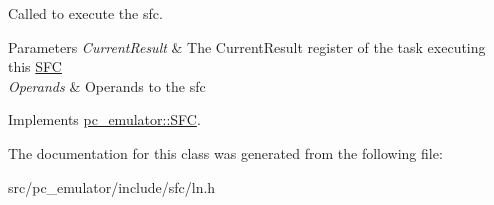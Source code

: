 Called to execute the sfc. 


\begin{DoxyParams}{Parameters}
{\em Current\+Result} & The Current\+Result register of the task executing this \hyperlink{classpc__emulator_1_1SFC}{S\+FC} \\
\hline
{\em Operands} & Operands to the sfc \\
\hline
\end{DoxyParams}


Implements \hyperlink{classpc__emulator_1_1SFC_ab206c80fc0e429c56672b4f6a0ca8635}{pc\+\_\+emulator\+::\+S\+FC}.



The documentation for this class was generated from the following file\+:\begin{DoxyCompactItemize}
\item 
src/pc\+\_\+emulator/include/sfc/ln.\+h\end{DoxyCompactItemize}
